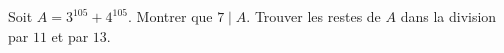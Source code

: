 Soit $A = 3^{105} + 4^{105}$. Montrer que $7 \mid A$. Trouver les restes de $A$ dans la division par $11$ et par $13$.
